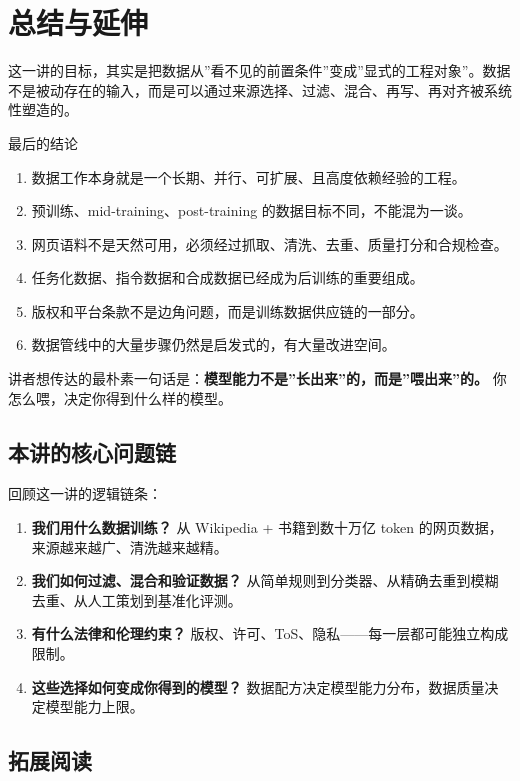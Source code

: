 \section{总结与延伸}

这一讲的目标，其实是把数据从”看不见的前置条件”变成”显式的工程对象”。数据不是被动存在的输入，而是可以通过来源选择、过滤、混合、再写、再对齐被系统性塑造的。

\begin{importantbox}{最后的结论}
\begin{enumerate}
    \item 数据工作本身就是一个长期、并行、可扩展、且高度依赖经验的工程。
    \item 预训练、mid-training、post-training 的数据目标不同，不能混为一谈。
    \item 网页语料不是天然可用，必须经过抓取、清洗、去重、质量打分和合规检查。
    \item 任务化数据、指令数据和合成数据已经成为后训练的重要组成。
    \item 版权和平台条款不是边角问题，而是训练数据供应链的一部分。
    \item 数据管线中的大量步骤仍然是启发式的，有大量改进空间。
\end{enumerate}
\end{importantbox}

讲者想传达的最朴素一句话是：\textbf{模型能力不是”长出来”的，而是”喂出来”的。} 你怎么喂，决定你得到什么样的模型。

\subsection{本讲的核心问题链}

回顾这一讲的逻辑链条：
\begin{enumerate}
    \item \textbf{我们用什么数据训练？} 从 Wikipedia + 书籍到数十万亿 token 的网页数据，来源越来越广、清洗越来越精。
    \item \textbf{我们如何过滤、混合和验证数据？} 从简单规则到分类器、从精确去重到模糊去重、从人工策划到基准化评测。
    \item \textbf{有什么法律和伦理约束？} 版权、许可、ToS、隐私——每一层都可能独立构成限制。
    \item \textbf{这些选择如何变成你得到的模型？} 数据配方决定模型能力分布，数据质量决定模型能力上限。
\end{enumerate}

\subsection{拓展阅读}

